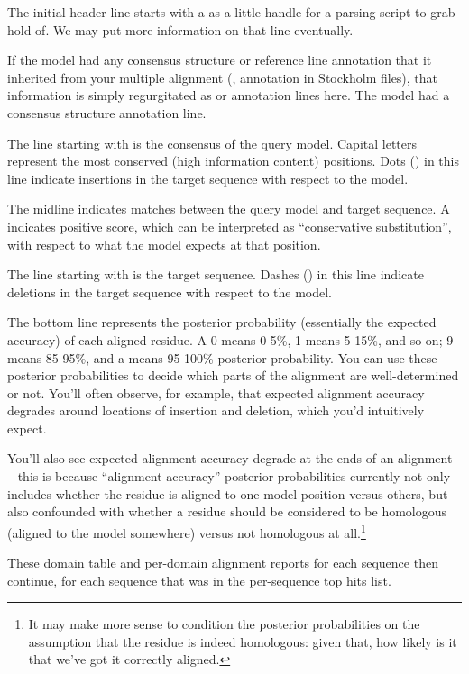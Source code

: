 The initial header line starts with a \prog{==} as a little handle for
a parsing script to grab hold of. We may put more information on that line
eventually.

If the model had any consensus structure or reference line annotation
that it inherited from your multiple alignment (,
 annotation in Stockholm files), that information is
simply regurgitated as  or  annotation lines
here. The  model had a consensus structure annotation line.

The line starting with  is the consensus of the query
model. Capital letters represent the most conserved (high information
content) positions. Dots () in this line indicate insertions
in the target sequence with respect to the model.

The midline indicates matches between the query model and target
sequence. A \prog{+} indicates positive score, which can be
interpreted as ``conservative substitution'', with respect to what the
model expects at that position.

The line starting with  is the target sequence.
Dashes (\prog{-}) in this line indicate deletions in the target
sequence with respect to the model.

The bottom line represents the posterior
probability (essentially the expected accuracy) of each aligned
residue. A 0 means 0-5\%, 1 means 5-15\%, and so on; 9 means 85-95\%,
and a \prog{*} means 95-100\% posterior probability. You can use these
posterior probabilities to decide which parts of the alignment are
well-determined or not. You'll often observe, for example, that
expected alignment accuracy degrades around locations of insertion and
deletion, which you'd intuitively expect. 

You'll also see expected alignment accuracy degrade at the ends of an
alignment -- this is because ``alignment accuracy'' posterior
probabilities currently not only includes whether the residue is
aligned to one model position versus others, but also confounded with
whether a residue should be considered to be homologous (aligned to
the model somewhere) versus not homologous at all.\footnote{It may
make more sense to condition the posterior probabilities on the
assumption that the residue is indeed homologous: given that, how
likely is it that we've got it correctly aligned.}


These domain table and per-domain alignment reports for each sequence
then continue, for each sequence that was in the per-sequence top hits
list.

